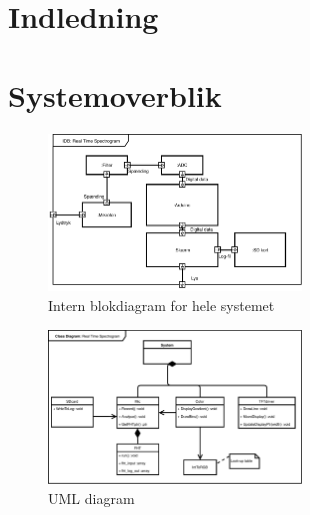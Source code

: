 


	
\section{Indledning}

%
%
%

\section{Systemoverblik}

\begin{figure}[H]
	\center
	\includegraphics[width = 0.6\textwidth]{Figur/IBD.pdf}
	\caption{Intern blokdiagram for hele systemet}
	\label{fig:ibd}
\end{figure}


\begin{figure}[H]
	\center
	\includegraphics[width = 0.6\textwidth]{Figur/UML.pdf}
	\caption{UML diagram}
	\label{fig:uml}
\end{figure}

